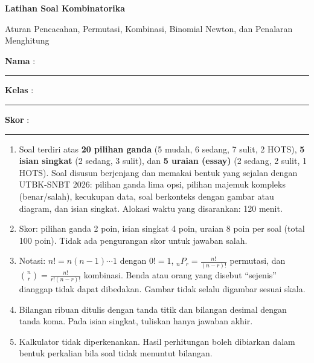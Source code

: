 \documentclass[a4paper,11pt]{article}
\newcommand{\Pm}[2]{{}_{#1}P_{#2}}
\newcounter{no}
\begin{document}
\thispagestyle{fancy}

\begin{center}
  {\color{mainc}\fontsize{22}{26}\selectfont\bfseries Latihan Soal Kombinatorika\par}
  \vspace{2pt}
  {\color{accc}\large Aturan Pencacahan, Permutasi, Kombinasi, Binomial Newton, dan Penalaran Menghitung\par}
\end{center}
\vspace{2pt}
\begin{tcolorbox}[colback=softbg,colframe=mainc!40,boxrule=0.6pt,arc=3pt,left=8pt,right=8pt,top=5pt,bottom=5pt]
\noindent\textbf{Nama} : \rule{4.6cm}{0.4pt}\hfill\textbf{Kelas} : \rule{2.2cm}{0.4pt}\hfill\textbf{Skor} : \rule{2.2cm}{0.4pt}
\end{tcolorbox}
\vspace{2pt}
\begin{tcolorbox}[colback=white,colframe=accc,boxrule=0.8pt,arc=3pt,left=8pt,right=8pt,top=4pt,bottom=4pt,title={\bfseries Petunjuk Pengerjaan},coltitle=white,fonttitle=\small]
\small
\begin{enumerate}[leftmargin=1.4em,itemsep=1pt,topsep=1pt]
\item Soal terdiri atas \textbf{20 pilihan ganda} (5 mudah, 6 sedang, 7 sulit, 2 HOTS), \textbf{5 isian singkat} (2 sedang, 3 sulit), dan \textbf{5 uraian (essay)} (2 sedang, 2 sulit, 1 HOTS). Soal disusun berjenjang dan memakai bentuk yang sejalan dengan UTBK-SNBT 2026: pilihan ganda lima opsi, pilihan majemuk kompleks (benar/salah), kecukupan data, soal berkonteks dengan gambar atau diagram, dan isian singkat. Alokasi waktu yang disarankan: 120 menit.
\item Skor: pilihan ganda 2 poin, isian singkat 4 poin, uraian 8 poin per soal (total 100 poin). Tidak ada pengurangan skor untuk jawaban salah.
\item Notasi: $n!=n(n-1)\cdots1$ dengan $0!=1$, $\Pm nr=\frac{n!}{(n-r)!}$ permutasi, dan $\binom nr=\frac{n!}{r!(n-r)!}$ kombinasi. Benda atau orang yang disebut ``sejenis'' dianggap tidak dapat dibedakan. Gambar tidak selalu digambar sesuai skala.
\item Bilangan ribuan ditulis dengan tanda titik dan bilangan desimal dengan tanda koma. Pada isian singkat, tuliskan hanya jawaban akhir.
\item Kalkulator tidak diperkenankan. Hasil perhitungan boleh dibiarkan dalam bentuk perkalian bila soal tidak menuntut bilangan.
\end{enumerate}
\end{tcolorbox}
\end{document}

